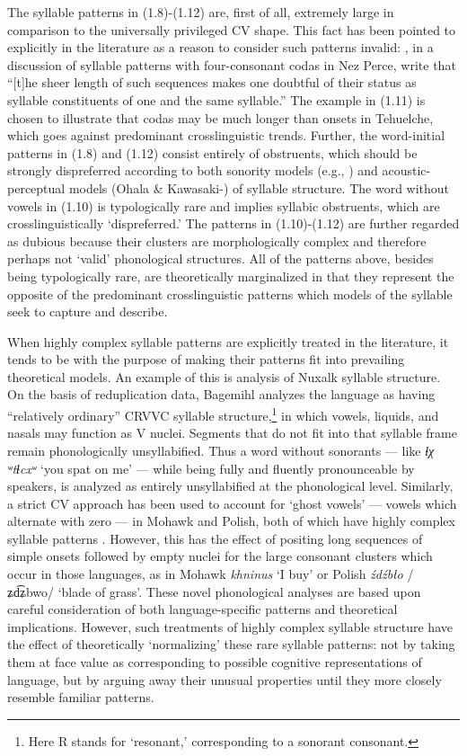   The syllable patterns in (1.8)-(1.12) are, first of all, extremely large in comparison to the universally privileged CV shape. This fact has been pointed to explicitly in the literature as a reason to consider such patterns invalid: \citet[195]{KayeEtAl1990}, in a discussion of syllable patterns with four-consonant codas in Nez Perce, write that “[t]he sheer length of such sequences makes one doubtful of their status as syllable constituents of one and the same syllable.” The example in (1.11) is chosen to illustrate that codas may be much longer than onsets in Tehuelche, which goes against predominant crosslinguistic trends. Further, the word-initial patterns in (1.8) and (1.12) consist entirely of obstruents, which should be strongly dispreferred according to both sonority models (e.g., \citealt{Clements1990}) and acoustic-perceptual models (Ohala \& Kawasaki-\citealt{Fukumori1997}) of syllable structure. The word without vowels in (1.10) is typologically rare and implies syllabic obstruents, which are crosslinguistically ‘dispreferred.’ The patterns in (1.10)-(1.12) are further regarded as dubious because their clusters are morphologically complex and therefore perhaps not ‘valid’ phonological structures. All of the patterns above, besides being typologically rare, are theoretically marginalized in that they represent the opposite of the predominant crosslinguistic patterns which models of the syllable seek to capture and describe.



  When highly complex syllable patterns are explicitly treated in the literature, it tends to be with the purpose of making their patterns fit into prevailing theoretical models. An example of this is  analysis of Nuxalk syllable structure. On the basis of reduplication data, Bagemihl analyzes the language as having “relatively ordinary” CRVVC syllable structure,\footnote{ \textrm{Here R stands for ‘resonant,’ corresponding to a sonorant consonant.}} in which vowels, liquids, and nasals may function as V nuclei. Segments that do not fit into that syllable frame remain phonologically unsyllabified. Thus a word without sonorants — like \textit{ɬχ} \textit{ʷtɬcxʷ} ‘you spat on me’ — while being fully and fluently pronounceable by speakers, is analyzed as entirely unsyllabified at the phonological level. Similarly, a strict CV approach has been used to account for ‘ghost vowels’ — vowels which alternate with zero — in Mohawk and Polish, both of which have highly complex syllable patterns \citep{Rowicka1999}. However, this has the effect of positing long sequences of simple onsets followed by empty nuclei for the large consonant clusters which occur in those languages, as in Mohawk \textit{khninus} ‘I buy’ or Polish \textit{źdźbło} /ʑd͡ʑbwo/ ‘blade of grass’. These novel phonological analyses are based upon careful consideration of both language-specific patterns and theoretical implications. However, such treatments of highly complex syllable structure have the effect of theoretically ‘normalizing’ these rare syllable patterns: not by taking them at face value as corresponding to possible cognitive representations of language, but by arguing away their unusual properties until they more closely resemble familiar patterns.



